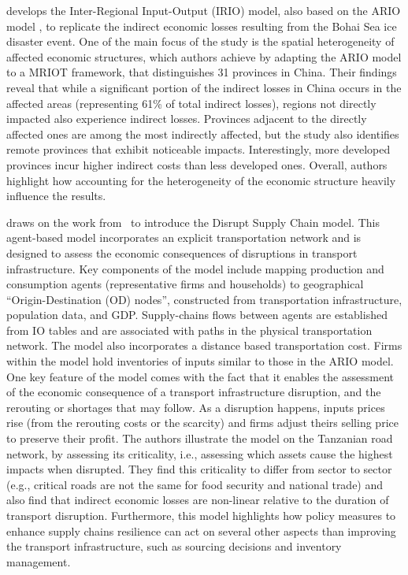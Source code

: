 \textcite{wang-2018-quant-spatial} develops the Inter-Regional
Input-Output (IRIO) model, also based on the ARIO model \parencite[version
from][]{hallegatte-2008-adapt-region}, to replicate the indirect
economic losses resulting from the Bohai Sea ice disaster event. One of the main
focus of the study is the spatial heterogeneity of
affected economic structures, which authors achieve by adapting the ARIO model
to a MRIOT framework, that distinguishes 31 provinces in China. Their findings
reveal that while a significant portion of the indirect losses in
China occurs in the affected areas (representing 61\% of total indirect losses),
regions not directly impacted also experience indirect losses. Provinces adjacent to
the directly affected ones are among the most indirectly affected, but the study
also identifies remote provinces that exhibit noticeable impacts. Interestingly, more
developed provinces incur higher indirect costs than less developed ones.
Overall, authors highlight how accounting for the heterogeneity of the economic
structure heavily influence the results.

\Textcite{colon-2020-critic-analy, colon-2019-trans-suppl} draws on
the work from~\textcite{hallegatte-2008-adapt-region, henriet-2012-firm-networ, hallegatte-2013-model-role} to introduce the Disrupt Supply
Chain model.  This agent-based model incorporates an explicit transportation
network and is designed to assess the economic consequences of disruptions in
transport infrastructure. Key components of the model include mapping production
and consumption agents (representative firms and households) to geographical
``Origin-Destination (OD) nodes'',
constructed from transportation infrastructure, population data, and GDP.
Supply-chains flows between agents are established from IO tables and are associated
with paths in the physical transportation network. The model also incorporates a
distance based transportation cost. Firms within the model hold inventories of
inputs similar to those in the ARIO model. One key feature of the model comes
with the fact that it enables the assessment of the economic consequence of a
transport infrastructure disruption, and the rerouting or shortages that may
follow. As a disruption happens, inputs prices rise (from the rerouting costs or
the scarcity) and firms adjust theirs selling price to preserve their profit.
The authors illustrate the model on the Tanzanian road network, by assessing its
criticality, i.e., assessing which assets cause the highest
impacts when disrupted. They find this criticality to differ from sector to
sector (e.g., critical roads are not the same for food security and national
trade) and also find that indirect economic losses are non-linear relative to the
duration of transport disruption. Furthermore, this model highlights how policy
measures to enhance supply chains resilience can act on several other aspects
than improving the transport infrastructure, such as sourcing decisions and
inventory management.

